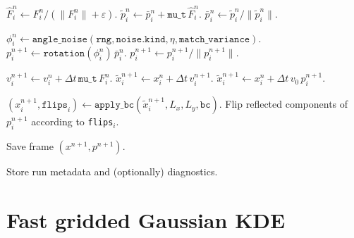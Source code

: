 \begin{breakablealgorithm}
{\begin{algorithmic}[1]
      \State $\widehat F_i^n \gets F_i^n/(\|F_i^n\|+\varepsilon)$.
      \State $\tilde p_i^n \gets \bar p_i^n + \texttt{mu\_t}\,\widehat F_i^n$.
      \State $\bar p_i^n \gets \tilde p_i^n/\|\tilde p_i^n\|$.
    \EndIf

    \State $\phi_i^n \gets \texttt{angle\_noise}(\texttt{rng},\texttt{noise.kind},\eta,\texttt{match\_variance})$.
    \State $p_i^{n+1} \gets \texttt{rotation}(\phi_i^n)\,\bar p_i^n$.
    \State $p_i^{n+1} \gets p_i^{n+1}/\|p_i^{n+1}\|$.

      \State $v_i^{n+1} \gets v_i^n + \Delta t\,\texttt{mu\_t}\,F_i^n$.
      \State $\tilde x_i^{n+1} \gets x_i^n + \Delta t\,v_i^{n+1}$.
    \Else
      \State $\tilde x_i^{n+1} \gets x_i^n + \Delta t\,v_0\,p_i^{n+1}$.
    \EndIf

    \State $(x_i^{n+1},\texttt{flips}_i)\gets \texttt{apply\_bc}(\tilde x_i^{n+1},L_x,L_y,\texttt{bc})$.
      \State Flip reflected components of $p_i^{n+1}$ according to \texttt{flips}$_i$.
    \EndIf

  \EndFor

    \State Save frame $(x^{n+1},p^{n+1})$.
  \EndIf

\EndFor

\State Store run metadata and (optionally) diagnostics.
\end{algorithmic}
}
\end{breakablealgorithm}

\section{Fast gridded Gaussian KDE}
\label{sec:app_kde}

